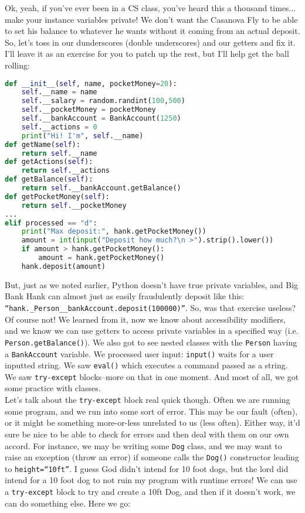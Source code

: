 \documentclass[12pt]{article}
\begin{document}
Ok, yeah, if you've ever been in a CS class, you've heard this a thousand times... make your instance variables private! We don't want the Casanova Fly to be able to set his balance to whatever he wants without it coming from an actual deposit. So, let's toss in our dunderscores (double underscores) and our getters and fix it. I'll leave it as an exercise for you to patch up the rest, but I'll help get the ball rolling:\\
\begin{lstlisting}[language=Python]
def __init__(self, name, pocketMoney=20):
    self.__name = name
    self.__salary = random.randint(100,500)
    self.__pocketMoney = pocketMoney
    self.__bankAccount = BankAccount(1250)
    self.__actions = 0
    print("Hi! I'm", self.__name)
def getName(self):
    return self.__name
def getActions(self):
    return self.__actions
def getBalance(self):
    return self.__bankAccount.getBalance()
def getPocketMoney(self):
    return self.__pocketMoney
...
elif processed == "d":
    print("Max deposit:", hank.getPocketMoney())
    amount = int(input("Deposit how much?\n >").strip().lower())
    if amount > hank.getPocketMoney(): 
        amount = hank.getPocketMoney()
    hank.deposit(amount)
\end{lstlisting}
But, just as we noted earlier, Python doesn't have true private variables, and Big Bank Hank can almost just as easily fraudulently deposit like this: \texttt{``hank.\_Person\_\_bankAccount.deposit(100000)''}. So, was that exercise useless? Of course not! We learned from it, now we know about accessibility modifiers, and we know we can use getters to access private variables in a specified way (i.e. \texttt{Person.getBalance()}). We also got to see nested classes with the \texttt{Person} having a \texttt{BankAccount} variable. We processed user input: \texttt{input()} waits for a user inputted string. We saw \texttt{eval()} which executes a command passed as a string. We saw \texttt{try-except} blocks--more on that in one moment. And most of all, we got some practice with classes.\\
Let's talk about the \texttt{try-except} block real quick though. Often we are running some program, and we run into some sort of error. This may be our fault (often), or it might be something more-or-less unrelated to us (less often). Either way, it'd sure be nice to be able to check for errors and then deal with them on our own accord. For instance, we may be writing some \texttt{Dog} class, and we may want to raise an exception (throw an error) if someone calls the \texttt{Dog()} constructor leading to \texttt{height=``10ft''}. I guess God didn't intend for 10 foot dogs, but the lord did intend for a 10 foot dog to not ruin my program with runtime errors! We can use a \texttt{try-except} block to try and create a 10ft Dog, and then if it doesn't work, we can do something else. Here we go:\\
\end{document}
